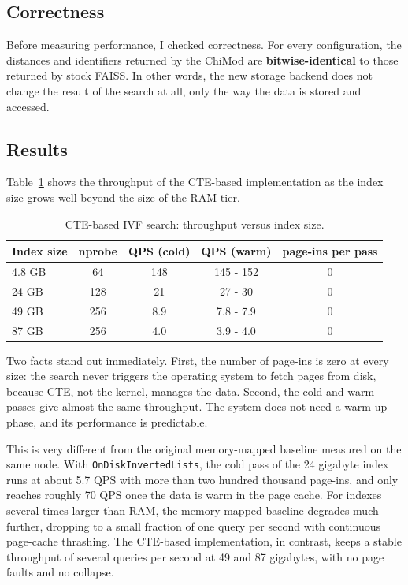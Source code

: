 \documentclass[11pt]{article}
\begin{document}
\subsection{Correctness}

Before measuring performance, I checked correctness. For every
configuration, the distances and identifiers returned by the ChiMod
are \textbf{bitwise-identical} to those returned by stock FAISS. In
other words, the new storage backend does not change the result of
the search at all, only the way the data is stored and accessed.

\subsection{Results}

Table~\ref{tab:qps} shows the throughput of the CTE-based
implementation as the index size grows well beyond the size of the
RAM tier.

\begin{table}[h]
\centering
\begin{tabular}{lcccc}
\toprule
Index size & nprobe & QPS (cold) & QPS (warm) & page-ins per pass \\
\midrule
4.8 GB  & 64  & 148 & 145 - 152 & 0 \\
24 GB   & 128 & 21  & 27 - 30   & 0 \\
49 GB   & 256 & 8.9 & 7.8 - 7.9 & 0 \\
87 GB   & 256 & 4.0 & 3.9 - 4.0 & 0 \\
\bottomrule
\end{tabular}
\caption{CTE-based IVF search: throughput versus index size.}
\label{tab:qps}
\end{table}

Two facts stand out immediately. First, the number of page-ins is
zero at every size: the search never triggers the operating system to
fetch pages from disk, because CTE, not the kernel, manages the data.
Second, the cold and warm passes give almost the same throughput. The
system does not need a warm-up phase, and its performance is
predictable.

This is very different from the original memory-mapped baseline
measured on the same node. With \texttt{OnDiskInvertedLists}, the cold
pass of the 24 gigabyte index runs at about 5.7 QPS with more than two
hundred thousand page-ins, and only reaches roughly 70 QPS once the
data is warm in the page cache. For indexes several times larger than
RAM, the memory-mapped baseline degrades much further, dropping to a
small fraction of one query per second with continuous page-cache
thrashing. The CTE-based implementation, in contrast, keeps a stable
throughput of several queries per second at 49 and 87 gigabytes, with
no page faults and no collapse.
\end{document}
